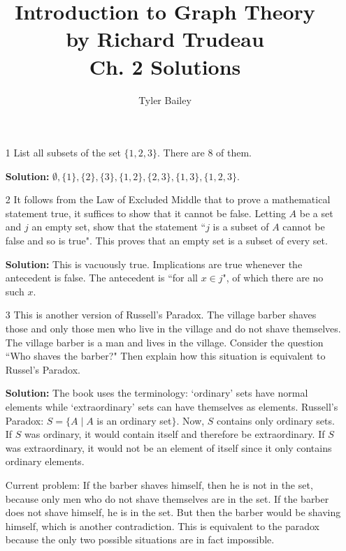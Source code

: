 \documentclass{article}
\begin{document}
\title{%
  Introduction to Graph Theory \\
  \large by Richard Trudeau \\
   Ch. 2 Solutions}
   \author{Tyler Bailey}
\maketitle

\begin{enumerate}
\item[1] List all subsets of the set $\{1, 2, 3\}$. There are 8 of them.

\textbf{Solution:} $\emptyset, \{1\}, \{2\}, \{3\}, \{1, 2\}, \{2, 3\}, \{1, 3\}, \{1, 2, 3\}.$

\item[2] It follows from the Law of Excluded Middle that to prove a mathematical statement true, it suffices
to show that it cannot be false. Letting $A$ be a set and $j$ an empty set, show that the statement ``$j$ is a subset of $A$ cannot be false and so is true". This proves that an empty set is a subset of every set.

\textbf{Solution:} This is vacuously true. Implications are true whenever the antecedent is false. The antecedent is ``for all $x \in j$", of which there are no such $x$.

\item[3] This is another version of Russell's Paradox. The village barber shaves those and only those men who live in the village and do not shave themselves. The village barber is a man and lives in the village. Consider the question ``Who shaves the barber?" Then explain how this situation is equivalent to Russel's Paradox.

\textbf{Solution:} The book uses the terminology: `ordinary' sets have normal elements while `extraordinary' sets can have themselves as elements. Russell's Paradox: $S = \{A \mid A$ is an ordinary set$\}$. Now, $S$ contains only ordinary sets. If $S$ was ordinary, it would contain itself and therefore be extraordinary. If $S$ was extraordinary, it would not be an element of itself since it only contains ordinary elements.

Current problem: If the barber shaves himself, then he is not in the set, because only men who do not shave themselves are in the set. If the barber does not shave himself, he is in the set. But then the barber would be shaving himself, which is another contradiction. This is equivalent to the paradox because the only two possible situations are in fact impossible.


\end{enumerate}
\end{document}

